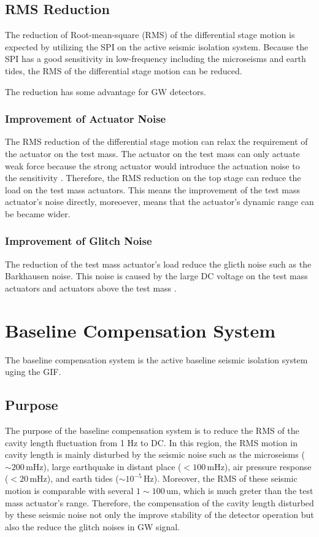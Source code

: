 \subsection{RMS Reduction}
The reduction of Root-mean-square (RMS) of the differential stage motion is expected by utilizing the SPI on the active seismic isolation system. Because the SPI has a good sensitivity in low-frequency including the microseisms and earth tides, the RMS of the differential stage motion can be reduced.

The reduction has some advantage for GW detectors.

\subsubsection{Improvement of Actuator Noise}
The RMS reduction of the differential stage motion can relax the requirement of the actuator on the test mass. The actuator on the test mass can only actuate weak force because the strong actuator would introduce the actuation noise to the sensitivity \cite{michimura2017mirror}. Therefore, the RMS reduction on the top stage can reduce the load on the test mass actuators. This means the improvement of the test mass actuator's noise directly, moreoever, means that the actuator's dynamic range can be became wider.

\subsubsection{Improvement of Glitch Noise}
The reduction of the test mass actuator's load reduce the glicth noise such as the Barkhausen noise. This noise is caused by the large DC voltage on the test mass actuators and actuators above the test mass \cite{aasi2015characterization}.




\section{Baseline Compensation System}\label{sec:52}
The baseline compensation system is the active baseline seismic isolation system uging the GIF. 

\subsection{Purpose}
The purpose of the baseline compensation system is to reduce the RMS of the cavity length fluctuation from 1 Hz to DC. In this region, the RMS motion in cavity length is mainly disturbed by the seismic noise such as the microseisms ($\sim 200\,\mathrm{mHz}$), large earthquake in distant place ($< 100\,\mathrm{mHz}$), air pressure response ($< 20\, \mathrm{mHz}$), and earth tides ($\sim 10^{-5}\,\mathrm{Hz}$). Moreover, the RMS of these seismic motion is comparable with several $1\sim100\,\mathrm{um}$, which is much greter than the test mass actuator's range. Therefore, the compensation of the cavity length disturbed by these seismic noise not only the improve stability of the detector operation but also the reduce the glitch noises in GW signal.

